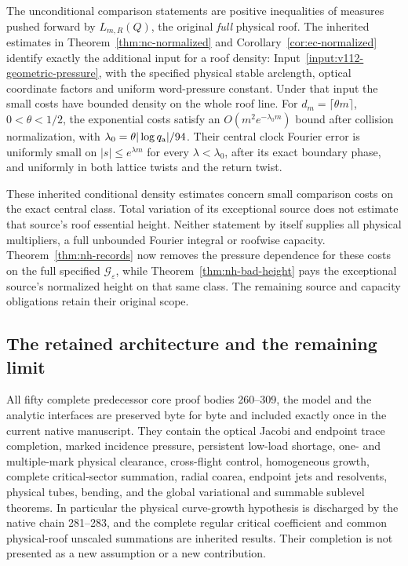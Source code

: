 \documentclass[11pt,reqno]{amsart}
\numberwithin{equation}{section}
\theoremstyle{definition}\newtheorem{definition}[theorem]{Definition}
\theoremstyle{remark}\newtheorem{remark}[theorem]{Remark}
\begin{document}
The unconditional comparison statements are positive inequalities
of measures pushed forward by $L_{m,R}(Q)$, the original
\emph{full} physical roof.  The inherited estimates in
Theorem~\ref{thm:nc-normalized} and
Corollary~\ref{cor:ec-normalized} identify exactly the additional
input for a roof density: Input~\ref{input:v112-geometric-pressure},
with the specified physical stable arclength, optical coordinate
factors and uniform word-pressure constant.  Under that input the
small costs have bounded density on the whole roof line.  For
$d_m=\lceil\theta m\rceil$, $0<\theta<1/2$, the exponential
costs satisfy an $O(m^2e^{-\lambda_0m})$ bound after collision
normalization, with
$\lambda_0=\theta|\log q_{\rm a}|/94$.
Their central clock Fourier error is uniformly small on
$|s|\le e^{\lambda m}$ for every $\lambda<\lambda_0$, after its
exact boundary phase, and uniformly in both lattice twists and
the return twist.

These inherited conditional density estimates concern small comparison
costs on the exact central class.  Total variation of its
exceptional source does not estimate that source's roof essential
height.  Neither statement by itself supplies all physical
multipliers, a full unbounded Fourier integral or roofwise capacity.
Theorem~\ref{thm:nh-records} now removes the pressure dependence
for these costs on the full specified $\mathcal G_\varepsilon$,
while Theorem~\ref{thm:nh-bad-height} pays the exceptional
source's normalized height on that same class.  The remaining
source and capacity obligations retain their original scope.

\subsection*{The retained architecture and the remaining limit}
All fifty complete predecessor core proof bodies 260--309,
the model and the analytic interfaces are preserved byte for byte
and included exactly once in the current native manuscript.
They contain the optical Jacobi and endpoint trace completion,
marked incidence pressure, persistent low-load shortage, one- and
multiple-mark physical clearance, cross-flight control, homogeneous
growth, complete critical-sector summation, radial coarea,
endpoint jets and resolvents, physical tubes, bending, and the
global variational and summable sublevel theorems.  In particular
the physical curve-growth hypothesis is discharged by the native
chain 281--283, and the complete regular critical coefficient
and common physical-roof unscaled summations are inherited results.
Their completion is not presented as a new assumption or a new
contribution.
\end{document}
